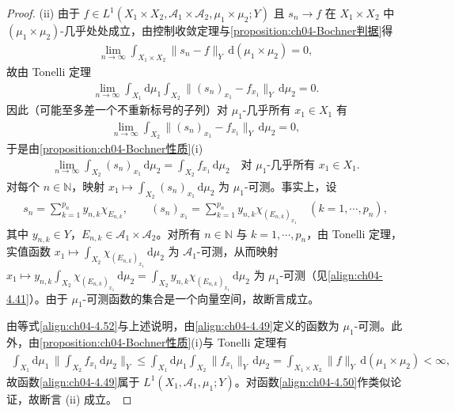 \documentclass[../../main.tex]{subfiles}%
\begin{document}
\begin{proof}
(ii) 由于 $f\in L^1(X_1\times X_2,\mathcal{A}_1\times\mathcal{A}_2,\mu_1\times\mu_2;Y)$ 且 $s_n\to f$ 在 $X_1\times X_2$ 中 $(\mu_1\times\mu_2)$-几乎处处成立，由控制收敛定理与\cref{proposition:ch04-Bochner判据}得
\begin{align*}
\lim_{n\to\infty}\int_{X_1\times X_2}\|s_n-f\|_Y\,\mathrm{d}(\mu_1\times\mu_2)=0,
\end{align*}
故由 Tonelli 定理
\begin{align*}
\lim_{n\to\infty}\int_{X_1}\mathrm{d}\mu_1\int_{X_2}\|(s_n)_{x_1}-f_{x_1}\|_Y\,\mathrm{d}\mu_2=0.
\end{align*}
因此（可能至多差一个不重新标号的子列）对 $\mu_1$-几乎所有 $x_1\in X_1$ 有
\begin{align*}
\lim_{n\to\infty}\int_{X_2}\|(s_n)_{x_1}-f_{x_1}\|_Y\,\mathrm{d}\mu_2=0,
\end{align*}
于是由\cref{proposition:ch04-Bochner性质}(i)
\begin{align}
\lim_{n\to\infty}\int_{X_2}(s_n)_{x_1}\,\mathrm{d}\mu_2=\int_{X_2}f_{x_1}\,\mathrm{d}\mu_2\quad\text{对 }\mu_1\text{-几乎所有 }x_1\in X_1. \label{align:ch04-4.52}
\end{align}
对每个 $n\in\mathbb{N}$，映射 $x_1\mapsto\int_{X_2}(s_n)_{x_1}\,\mathrm{d}\mu_2$ 为 $\mu_1$-可测。事实上，设
\begin{align*}
s_n=\sum_{k=1}^{p_n}y_{n,k}\chi_{E_{n,k}},\qquad (s_n)_{x_1}=\sum_{k=1}^{p_n}y_{n,k}\chi_{(E_{n,k})_{x_1}}\quad(k=1,\cdots ,p_n),
\end{align*}
其中 $y_{n,k}\in Y$，$E_{n,k}\in\mathcal{A}_1\times\mathcal{A}_2$。对所有 $n\in\mathbb{N}$ 与 $k=1,\cdots ,p_n$，由 Tonelli 定理，实值函数 $x_1\mapsto\int_{X_2}\chi_{(E_{n,k})_{x_1}}\,\mathrm{d}\mu_2$ 为 $\mathcal{A}_1$-可测，从而映射 $x_1\mapsto y_{n,k}\int_{X_2}\chi_{(E_{n,k})_{x_1}}\,\mathrm{d}\mu_2=\int_{X_2}y_{n,k}\chi_{(E_{n,k})_{x_1}}\,\mathrm{d}\mu_2$ 为 $\mu_1$-可测（见\eqref{align:ch04-4.41}）。由于 $\mu_1$-可测函数的集合是一个向量空间，故断言成立。

由等式\eqref{align:ch04-4.52}与上述说明，由\eqref{align:ch04-4.49}定义的函数为 $\mu_1$-可测。此外，由\cref{proposition:ch04-Bochner性质}(i)与 Tonelli 定理有
\begin{align*}
\int_{X_1}\mathrm{d}\mu_1\,\Big\|\int_{X_2}f_{x_1}\,\mathrm{d}\mu_2\Big\|_Y\leqslant\int_{X_1}\mathrm{d}\mu_1\int_{X_2}\|f_{x_1}\|_Y\,\mathrm{d}\mu_2=\int_{X_1\times X_2}\|f\|_Y\,\mathrm{d}(\mu_1\times\mu_2)<\infty,
\end{align*}
故函数\eqref{align:ch04-4.49}属于 $L^1(X_1,\mathcal{A}_1,\mu_1;Y)$。对函数\eqref{align:ch04-4.50}作类似论证，故断言 (ii) 成立。


\end{proof}
\end{document}
